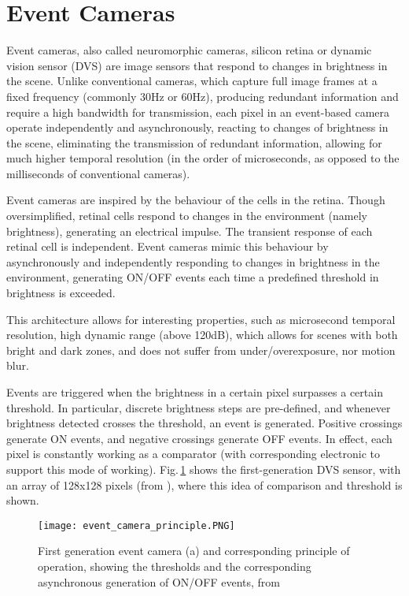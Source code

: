 \section{Event Cameras}
\label{sec:sec2_event}

Event cameras, also called neuromorphic cameras, silicon retina or dynamic vision sensor (DVS) are image sensors that respond to changes in brightness in the scene. Unlike conventional cameras, which capture full image frames at a fixed frequency (commonly 30Hz or 60Hz), producing redundant information and require a high bandwidth for transmission, each pixel in an event-based camera operate independently and asynchronously, reacting to changes of brightness in the scene, eliminating the transmission of redundant information, allowing for much higher temporal resolution (in the order of microseconds, as opposed to the milliseconds of conventional cameras).

Event cameras are inspired by the behaviour of the cells in the retina. Though oversimplified, retinal cells respond to changes in the environment (namely brightness), generating an electrical impulse. The transient response of each retinal cell is independent. Event cameras mimic this behaviour by asynchronously and independently responding to changes in brightness in the environment, generating ON/OFF events each time a predefined threshold in brightness is exceeded.

This architecture allows for interesting properties, such as microsecond temporal resolution, high dynamic range (above 120dB), which allows for scenes with both bright and dark zones, and does not suffer from under/overexposure, nor motion blur.

Events are triggered when the brightness in a certain pixel surpasses a certain threshold. In particular, discrete brightness steps are pre-defined, and whenever brightness detected crosses the threshold, an event is generated. Positive crossings generate ON events, and negative crossings generate OFF events. In effect, each pixel is constantly working as a comparator (with corresponding electronic to support this mode of working). Fig.\,\ref{fig:sec2_event_camera} shows the first-generation DVS sensor, with an array of 128x128 pixels (from \cite{lichtsteiner2008128}), where this idea of comparison and threshold is shown.

\begin{figure}[ht]
    \centering
    \texttt{[image: event\_camera\_principle.PNG]}
    \caption[Event camera and operation principle]{First generation event camera (a) and corresponding principle of operation, showing the thresholds and the corresponding asynchronous generation of ON/OFF events, from \cite{clady2015asynchronous}}
    \label{fig:sec2_event_camera}
\end{figure}

